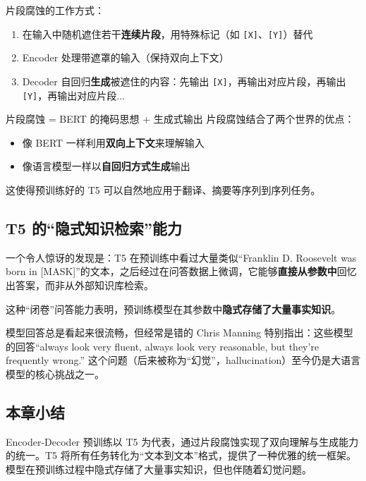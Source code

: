 \documentclass[a4paper]{article}
\begin{document}
片段腐蚀的工作方式：
\begin{enumerate}
    \item 在输入中随机遮住若干\textbf{连续片段}，用特殊标记（如 \texttt{[X]}、\texttt{[Y]}）替代
    \item Encoder 处理带遮罩的输入（保持双向上下文）
    \item Decoder 自回归\textbf{生成}被遮住的内容：先输出 \texttt{[X]}，再输出对应片段，再输出 \texttt{[Y]}，再输出对应片段...
\end{enumerate}

\begin{importantbox}{片段腐蚀 = BERT 的掩码思想 + 生成式输出}
片段腐蚀结合了两个世界的优点：
\begin{itemize}
    \item 像 BERT 一样利用\textbf{双向上下文}来理解输入
    \item 像语言模型一样以\textbf{自回归方式生成}输出
\end{itemize}
这使得预训练好的 T5 可以自然地应用于翻译、摘要等序列到序列任务。
\end{importantbox}

\subsection{T5 的``隐式知识检索''能力}

一个令人惊讶的发现是：T5 在预训练中看过大量类似``Franklin D. Roosevelt was born in [MASK]''的文本，之后经过在问答数据上微调，它能够\textbf{直接从参数中}回忆出答案，而非从外部知识库检索。

这种``闭卷''问答能力表明，预训练模型在其参数中\textbf{隐式存储了大量事实知识}。

\begin{warningbox}{模型回答总是看起来很流畅，但经常是错的}
Chris Manning 特别指出：这些模型的回答``always look very fluent, always look very reasonable, but they're frequently wrong.'' 这个问题（后来被称为``幻觉''，hallucination）至今仍是大语言模型的核心挑战之一。
\end{warningbox}

\subsection{本章小结}

Encoder-Decoder 预训练以 T5 为代表，通过片段腐蚀实现了双向理解与生成能力的统一。T5 将所有任务转化为``文本到文本''格式，提供了一种优雅的统一框架。模型在预训练过程中隐式存储了大量事实知识，但也伴随着幻觉问题。
\end{document}
